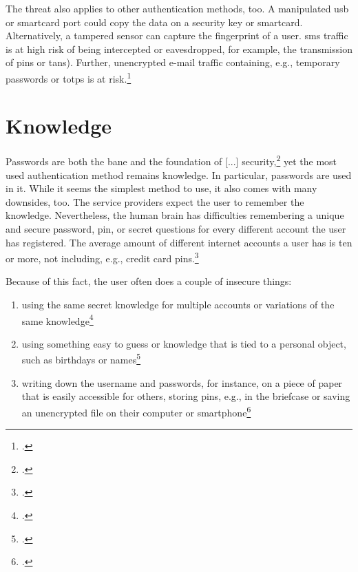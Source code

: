 The threat also applies to other authentication methods, too. A manipulated \gls{usb} or smartcard port could copy the data on a security key or smartcard. Alternatively, a tampered sensor can capture the fingerprint of a user. \gls{sms} traffic is at high risk of being intercepted or eavesdropped, for example, the transmission of \glspl{pin} or \glspl{tan}). Further, unencrypted e-mail traffic containing, e.g., temporary passwords or \glspl{totp} is at risk.\footcites[See][103]{2241278}[See][58]{dotson2019practical}[See][6]{Mayes2017}


\section{Knowledge}

\frqq Passwords are both the bane and the foundation of [...] security\flqq{},\footcite[206]{517355} yet the most used authentication method remains knowledge. In particular, passwords are used in \gls{it}. While it seems the simplest method to use, it also comes with many downsides, too. The service providers expect the user to remember the knowledge. Nevertheless, the human brain has difficulties remembering a unique and secure password, \gls{pin}, or secret questions for every different account the user has registered. The average amount of different internet accounts a user has is ten or more, not including, e.g., credit card \glspl{pin}.\footcites[See][7, 9]{lastpass}[See][424]{doi:10.1002/9781118256107.ch37}

Because of this fact, the user often does a couple of insecure things:

\begin{enumerate}[label=(\alph*)]
	\item using the same secret knowledge for multiple accounts or variations of the same knowledge\footcites[See][8]{yougov}[See][14]{sweden-passwords}[See][7]{lastpass}
	\item using something easy to guess or knowledge that is tied to a personal object, such as birthdays or names\footcites[See][]{web-de-passwords}[See][34]{anderson2008security}
	\item writing down the username and passwords, for instance, on a piece of paper that is easily accessible for others, storing \glspl{pin}, e.g., in the briefcase or saving an unencrypted file on their computer or smartphone\footcites[See][]{web-de-passwords}[See][6]{yougov2}

\end{enumerate}

